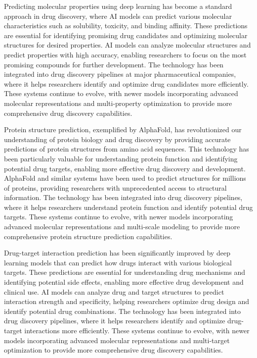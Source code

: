 Predicting molecular properties using deep learning has become a standard approach in drug discovery, where AI models can predict various molecular characteristics such as solubility, toxicity, and binding affinity. These predictions are essential for identifying promising drug candidates and optimizing molecular structures for desired properties. AI models can analyze molecular structures and predict properties with high accuracy, enabling researchers to focus on the most promising compounds for further development. The technology has been integrated into drug discovery pipelines at major pharmaceutical companies, where it helps researchers identify and optimize drug candidates more efficiently. These systems continue to evolve, with newer models incorporating advanced molecular representations and multi-property optimization to provide more comprehensive drug discovery capabilities.

Protein structure prediction, exemplified by AlphaFold, has revolutionized our understanding of protein biology and drug discovery by providing accurate predictions of protein structures from amino acid sequences. This technology has been particularly valuable for understanding protein function and identifying potential drug targets, enabling more effective drug discovery and development. AlphaFold and similar systems have been used to predict structures for millions of proteins, providing researchers with unprecedented access to structural information. The technology has been integrated into drug discovery pipelines, where it helps researchers understand protein function and identify potential drug targets. These systems continue to evolve, with newer models incorporating advanced molecular representations and multi-scale modeling to provide more comprehensive protein structure prediction capabilities.

Drug-target interaction prediction has been significantly improved by deep learning models that can predict how drugs interact with various biological targets. These predictions are essential for understanding drug mechanisms and identifying potential side effects, enabling more effective drug development and clinical use. AI models can analyze drug and target structures to predict interaction strength and specificity, helping researchers optimize drug design and identify potential drug combinations. The technology has been integrated into drug discovery pipelines, where it helps researchers identify and optimize drug-target interactions more efficiently. These systems continue to evolve, with newer models incorporating advanced molecular representations and multi-target optimization to provide more comprehensive drug discovery capabilities.

